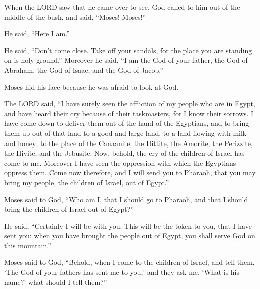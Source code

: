  When the LORD saw that he came over to see, God called to
him out of the middle of the bush, and said, ``Moses! Moses!''

He said, ``Here I am.''

 He said, ``Don't come close. Take off your sandals, for
the place you are standing on is holy ground.''  Moreover
he said, ``I am the God of your father, the God of Abraham, the God of
Isaac, and the God of Jacob.''

Moses hid his face because he was afraid to look at God.

 The LORD said, ``I have surely seen the affliction of my
people who are in Egypt, and have heard their cry because of their
taskmasters, for I know their sorrows.  I have come down
to deliver them out of the hand of the Egyptians, and to bring them up
out of that land to a good and large land, to a land flowing with milk
and honey; to the place of the Canaanite, the Hittite, the Amorite, the
Perizzite, the Hivite, and the Jebusite.  Now, behold, the
cry of the children of Israel has come to me. Moreover I have seen the
oppression with which the Egyptians oppress them.  Come
now therefore, and I will send you to Pharaoh, that you may bring my
people, the children of Israel, out of Egypt.''

 Moses said to God, ``Who am I, that I should go to
Pharaoh, and that I should bring the children of Israel out of Egypt?''

 He said, ``Certainly I will be with you. This will be
the token to you, that I have sent you: when you have brought the people
out of Egypt, you shall serve God on this mountain.''

 Moses said to God, ``Behold, when I come to the children
of Israel, and tell them, `The God of your fathers has sent me to you,'
and they ask me, `What is his name?' what should I tell them?''

